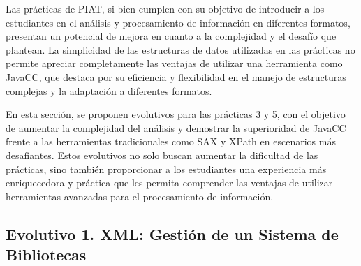 

\noindent Las prácticas de PIAT, si bien cumplen con su objetivo de introducir a los estudiantes en el análisis y procesamiento de información en diferentes formatos, presentan un potencial de mejora en cuanto a la complejidad y el desafío que plantean. La simplicidad de las estructuras de datos utilizadas en las prácticas no permite apreciar completamente las ventajas de utilizar una herramienta como JavaCC, que destaca por su eficiencia y flexibilidad en el manejo de estructuras complejas y la adaptación a diferentes formatos.

En esta sección, se proponen evolutivos para las prácticas 3 y 5, con el objetivo de aumentar la complejidad del análisis y demostrar la superioridad de JavaCC frente a las herramientas tradicionales como SAX y XPath en escenarios más desafiantes. Estos evolutivos no solo buscan aumentar la dificultad de las prácticas, sino también proporcionar a los estudiantes una experiencia más enriquecedora y práctica que les permita comprender las ventajas de utilizar herramientas avanzadas para el procesamiento de información.

\subsection{Evolutivo 1. XML: Gestión de un Sistema de Bibliotecas}



